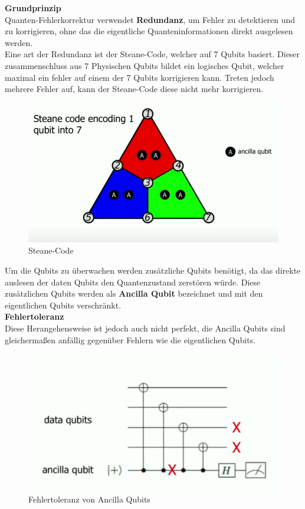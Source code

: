 \textbf{Grundprinzip}\\
Quanten-Fehlerkorrektur verwendet \textbf{Redundanz}, um Fehler zu detektieren und zu korrigieren, ohne das die eigentliche Quanteninformationen direkt ausgelesen werden.\\

Eine art der Redundanz ist der Steane-Code, welcher auf 7 Qubits basiert. Dieser zusammenschluss aus 7 Physischen Qubits bildet ein logisches Qubit,
welcher maximal ein fehler auf einem der 7 Qubits korrigieren kann. Treten jedoch mehrere Fehler auf, kann der Steane-Code diese nicht mehr korrigieren.\\

\begin{figure}[H]
    \centering
    \includegraphics[width=0.75\linewidth]{img/Steane.png}
    \caption{Steane-Code}
    \label{fig:Steane}
\end{figure}

Um die Qubits zu überwachen werden zusätzliche Qubits benötigt, da das direkte auslesen der daten Qubits den Quantenzustand zerstören würde.
Diese zusätzlichen Qubits werden als \textbf{Ancilla Qubit} bezeichnet und mit den eigentlichen Qubits verschränkt.\\

\textbf{Fehlertoleranz}\\
Diese Herangehensweise ist jedoch auch nicht perfekt, die Ancilla Qubits sind gleichermaßen anfällig gegenüber Fehlern wie die eigentlichen Qubits.\\

\begin{figure}[H]
    \centering
    \includegraphics[width=0.75\linewidth]{img/Fehlertoleranz.png}
    \caption{Fehlertoleranz von Ancilla Qubits}
    \label{fig:Fehlertoleranz}
\end{figure}

